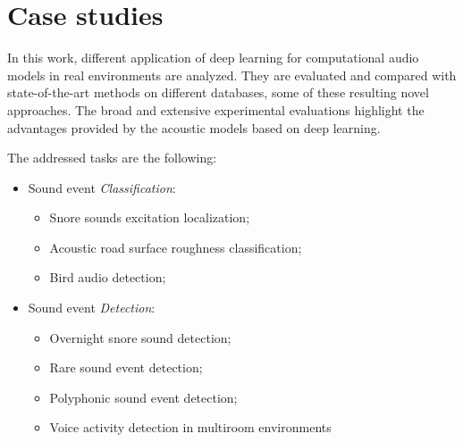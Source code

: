 

\section{Case studies}
In this work, different application of deep learning for computational audio models in real environments are analyzed. They are evaluated and compared with state-of-the-art methods on different databases, some of these resulting novel approaches. The broad and extensive experimental evaluations highlight the advantages provided by the acoustic models based on deep learning.

The addressed tasks are the following:
\begin{itemize}
	\item Sound event \textit{Classification}:
	\begin{itemize}
		\item Snore sounds excitation localization;
		\item Acoustic road surface roughness classification;
		\item Bird audio detection;
	\end{itemize}
	\item Sound event \textit{Detection}:
	\begin{itemize}
		\item Overnight snore sound detection;
		\item Rare sound event detection;
		\item Polyphonic sound event detection;
		\item Voice activity detection in multiroom environments
	\end{itemize}
\end{itemize}




